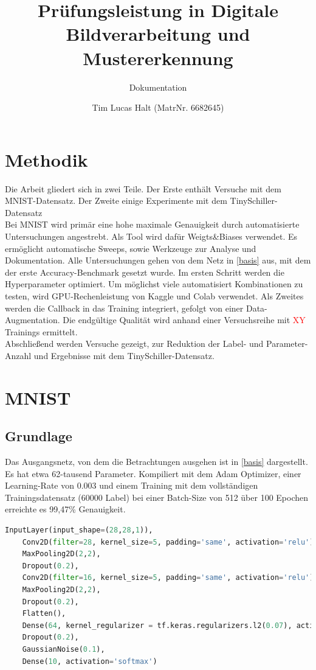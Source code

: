 \documentclass[
fontsize=12pt,					%
paper=a4,						%
twoside=false, 					%
listof=totoc, 					%
bibliography=totoc,				%
titlepage, 						%
headsepline, 					%
DIV=12,							%
BCOR=6mm,						%
cleardoublepage=empty,			%
parskip,							%
ngerman
]{scrartcl}
\title{Prüfungsleistung in \glqq Digitale Bildverarbeitung und Mustererkennung\grqq}
\subtitle{Dokumentation}
\author{Tim Lucas Halt (MatrNr. 6682645)}
\begin{document}
\maketitle

\section{Methodik}

Die Arbeit gliedert sich in zwei Teile. Der Erste enthält Versuche mit dem MNIST-Datensatz. Der Zweite einige Experimente mit dem TinySchiller-Datensatz\\
Bei MNIST wird primär eine hohe maximale Genauigkeit durch automatisierte Untersuchungen angestrebt. Als Tool wird dafür Weigts\&Biases \autocite{wandb.sweep} verwendet. Es ermöglicht automatische Sweeps, sowie Werkzeuge zur Analyse und Dokumentation. Alle Untersuchungen gehen von dem Netz in \autoref{basis} aus, mit dem der erste Accuracy-Benchmark gesetzt wurde. Im ersten Schritt werden die Hyperparameter optimiert. Um möglichst viele automatisiert Kombinationen zu testen, wird GPU-Rechenleistung von Kaggle und Colab verwendet. Als Zweites werden die Callback in das Training integriert, gefolgt von einer Data-Augmentation. Die endgültige Qualität wird anhand einer Versuchsreihe mit \textcolor{red}{XY} Trainings ermittelt.\\
Abschließend werden Versuche gezeigt, zur Reduktion der Label- und Parameter-Anzahl und Ergebnisse mit dem TinySchiller-Datensatz.

\section{MNIST}

\subsection{Grundlage}
\label{sec:basis}

Das Ausgangsnetz, von dem die Betrachtungen ausgehen ist in \autoref{basis} dargestellt. Es hat etwa 62-tausend Parameter. Kompiliert mit dem Adam Optimizer, einer Learning-Rate von 0.003 und einem Training mit dem vollständigen Trainingsdatensatz (60000 Label) bei einer Batch-Size von 512 über 100 Epochen erreichte es 99,47\% Genauigkeit.

\begin{lstlisting}[language=Python, caption=Grundlagen-Netz, label=basis]
	InputLayer(input_shape=(28,28,1)),
	Conv2D(filter=28, kernel_size=5, padding='same', activation='relu'),
	MaxPooling2D(2,2),
	Dropout(0.2),
	Conv2D(filter=16, kernel_size=5, padding='same', activation='relu'),
	MaxPooling2D(2,2),
	Dropout(0.2),
	Flatten(),
	Dense(64, kernel_regularizer = tf.keras.regularizers.l2(0.07), activation = 'relu'),
	Dropout(0.2),
	GaussianNoise(0.1),
	Dense(10, activation='softmax')
\end{lstlisting}
\end{document}
